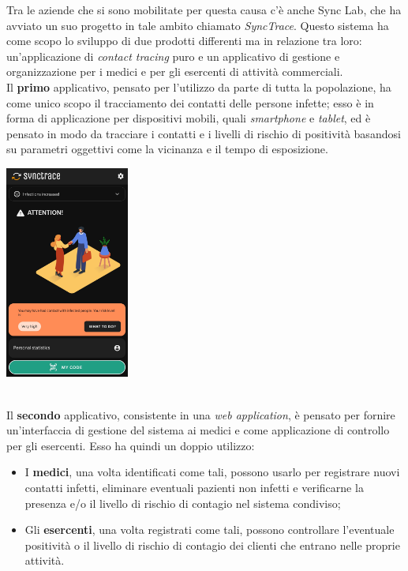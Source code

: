 Tra le aziende che si sono mobilitate per questa causa c'è anche Sync Lab, che ha avviato un suo progetto in tale ambito chiamato \textit{SyncTrace}. Questo sistema ha come scopo lo sviluppo di due prodotti differenti ma in relazione tra loro: un'applicazione di \textit{contact tracing} puro e un applicativo di gestione e organizzazione per i medici e per gli esercenti di attività commerciali. \\
Il \textbf{primo} applicativo, pensato per l'utilizzo da parte di tutta la popolazione, ha come unico scopo il tracciamento dei contatti delle persone infette; esso è in forma di applicazione per dispositivi mobili, quali \textit{smartphone} e \textit{tablet}, ed è pensato in modo da tracciare i contatti e i livelli di rischio di positività basandosi su parametri oggettivi come la vicinanza e il tempo di esposizione. \\

\begin{minipage}{\linewidth}
  \centering
    \includegraphics[height=7cm]{immagini/synctraceandroid}
\end{minipage} \\

Il \textbf{secondo} applicativo, consistente in una \textit{web application}, è pensato per fornire un'interfaccia di gestione del sistema ai medici e come applicazione di controllo per gli esercenti. Esso ha quindi un doppio utilizzo:
\begin{itemize}
  \item I \textbf{medici}, una volta identificati come tali, possono usarlo per registrare nuovi contatti infetti, eliminare eventuali pazienti non infetti e verificarne la presenza e/o il livello di rischio di contagio nel sistema condiviso;
  \item Gli \textbf{esercenti}, una volta registrati come tali, possono controllare l'eventuale positività o il livello di rischio di contagio dei clienti che entrano nelle proprie attività.
\end{itemize}

